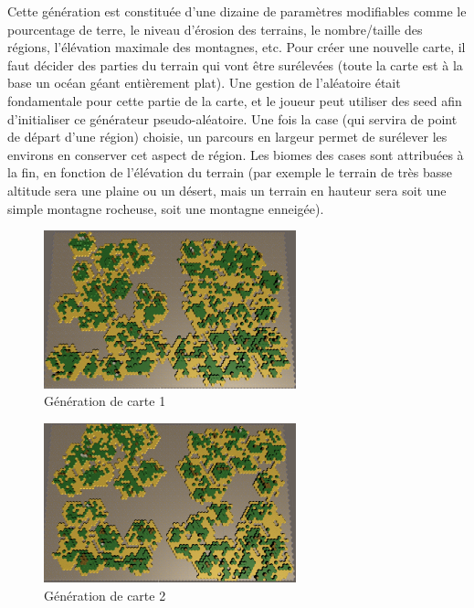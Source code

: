\documentclass[12pt]{report}
\begin{document}
Cette génération est constituée d’une dizaine de paramètres modifiables comme le
pourcentage de terre, le niveau d’érosion des terrains, le nombre/taille des
régions, l’élévation maximale des montagnes, etc. Pour créer une nouvelle carte,
il faut décider des parties du terrain qui vont être surélevées (toute la carte
est à la base un océan géant entièrement plat). Une gestion de l’aléatoire était
fondamentale pour cette partie de la carte, et le joueur peut utiliser des seed
afin d’initialiser ce générateur pseudo-aléatoire. Une fois la case (qui servira
de point de départ d’une région) choisie, un parcours en largeur permet de
surélever les environs en conserver cet aspect de région. Les biomes des cases
sont attribuées à la fin, en fonction de l’élévation du terrain (par exemple le
terrain de très basse altitude sera une plaine ou un désert, mais un terrain en
hauteur sera soit une simple montagne rocheuse, soit une montagne enneigée).

\begin{figure}[H]
    \centering
    \includegraphics[width=0.65\textwidth]{../report_2/img/MapGen1}
    \caption*{Génération de carte 1}
\end{figure}

\begin{figure}[H]
    \centering
    \includegraphics[width=0.65\textwidth]{../report_2/img/MapGen2}
    \caption*{Génération de carte 2}
\end{figure}
\end{document}
